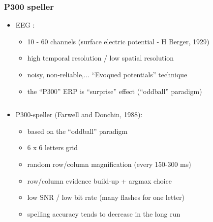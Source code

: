 \documentclass{beamer}
\begin{document}
\begin{frame} \frametitle{P300 speller}
	\begin{itemize}
		\item EEG : 
		\begin{itemize}
			\item 10 - 60 channels (surface electric potential - H Berger, 1929)
			\item high temporal resolution / low spatial resolution
			\item noisy, non-reliable,... ``Evoqued potentials'' technique
			\item the ``P300'' ERP is ``surprise'' effect (``oddball'' paradigm)
		\end{itemize}
	\end{itemize}
	\begin{columns}
		\begin{column}{0.75\linewidth}
			\begin{itemize}
				\item P300-speller (Farwell and Donchin, 1988):
				\begin{itemize}
					\item based on the ``oddball'' paradigm
					\item 6 x 6 letters grid
					\item random row/column magnification (every 150-300 ms)
					\item row/column evidence build-up + argmax choice
					\item low SNR / low bit rate (many flashes for one letter)
					\item spelling accuracy tends to decrease in the long run
				\end{itemize}
			\end{itemize}
		\end{column}
		\begin{column}{0.25\linewidth}
			\centerline{
}
\end{column}
\end{columns}
\end{frame}
\end{document}
